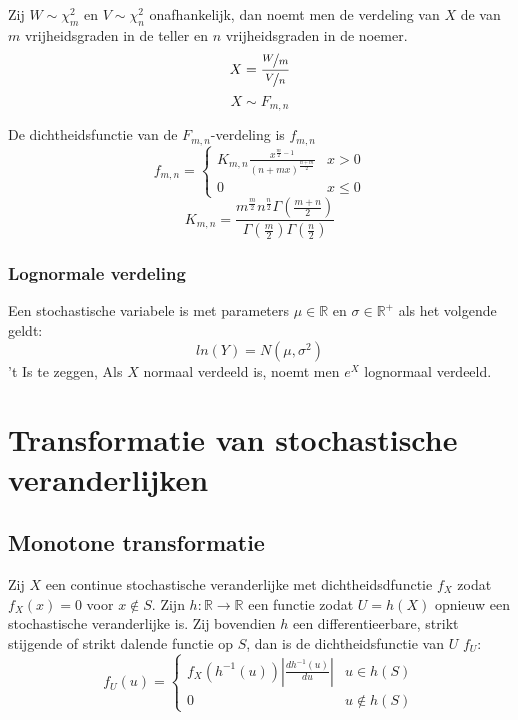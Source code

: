 \documentclass[main.tex]{subfiles}
\begin{document}
\begin{de}
  Zij $ W\sim \chi_{m}^{2}$ en $V \sim \chi_{n}^{2}$ onafhankelijk, dan noemt men de verdeling van $X$ de  van $m$ vrijheidsgraden in de teller en $n$ vrijheidsgraden in de noemer.
  \[ X = \frac{\nicefrac{W}{m}}{\nicefrac{V}{n}} \]
  \[ X \sim F_{m,n} \]
\end{de}

\begin{st}
  De dichtheidsfunctie van de $F_{m,n}$-verdeling is $f_{m,n}$
  \[
  f_{m,n} = 
  \left\{
    \begin{array}{ll}
      K_{m,n}\frac{x^{\frac{m}{2}-1}}{(n+mx)^{\frac{n+m}{2}}} & x > 0\\
      0 & x \le 0
    \end{array}
  \right.
  \]
  \[
  K_{m,n} = \frac{m^{\frac{m}{2}}n^{\frac{n}{2}}\Gamma\left(\frac{m+n}{2}\right)}{\Gamma\left(\frac{m}{2}\right)\Gamma\left(\frac{n}{2}\right)}
  \]
  \zb
\end{st}

\subsubsection{Lognormale verdeling}
\label{sec:lognormale-verdeling}

\begin{de}
  Een stochastische variabele is  met parameters $\mu \in\mathbb{R}$ en $\sigma \in \mathbb{R}^{+}$ als het volgende geldt:
  \[ ln(Y) = N(\mu,\sigma^{2})\]
  't Is te zeggen, Als $X$ normaal verdeeld is, noemt men $e^{X}$ lognormaal verdeeld.
\end{de}

\section{Transformatie van stochastische veranderlijken}
\label{sec:transf-van-stoch}

\subsection{Monotone transformatie}
\label{sec:monot-transf}

\begin{st}
  Zij $X$ een continue stochastische veranderlijke met dichtheidsdfunctie $f_{X}$ zodat $f_{X}(x)=0$ voor $x\not\in S$. Zijn $h: \mathbb{R} \rightarrow \mathbb{R}$ een functie zodat $U=h(X)$ opnieuw een stochastische veranderlijke is. Zij bovendien $h$ een differentieerbare, strikt stijgende of strikt dalende functie op $S$, dan is de dichtheidsfunctie van $U$ $f_{U}$:
  \[
  f_{U}(u) = 
  \left\{
    \begin{array}{ll}
      f_{X}(h^{-1}(u)) \left| \frac{dh^{-1}(u)}{du} \right|& u\in h(S)\\
      0 & u \not \in h(S)
    \end{array}
  \right.
  \]
\end{st}
\end{document}
